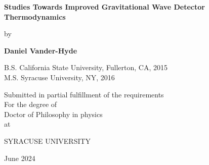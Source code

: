 \documentclass[12pt]{report}
\begin{document}
\begin{titlepage}
\begin{center}
       \vspace*{1cm}

       \textbf{\LARGE Studies Towards Improved Gravitational Wave Detector Thermodynamics}

       \vspace{0.5cm}
       {\large by}
            
       \vspace{0.5cm}

       \textbf{\large Daniel Vander-Hyde}


       \vspace{0.5cm}
       {\large B.S. California State University, Fullerton, CA, 2015}
       \\
       {\large M.S. Syracuse University, NY, 2016}
       
       \vspace{1.0cm}
             
       {\large Submitted in partial fulfillment of the requirements\\
       For the degree of \\
       Doctor of Philosophy in physics\\
       at}

       \vspace{0.5cm}

       {\large \uppercase{Syracuse University}}
       \vfill
     
       June 2024
            
   \end{center}
\end{titlepage}

\end{document}
